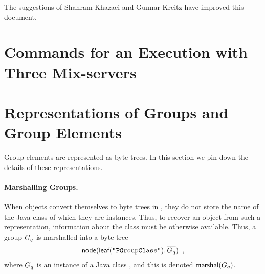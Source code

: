 \documentclass[11pt]{article}
\begin{document}
The suggestions of Shahram Khazaei and Gunnar Kreitz have improved
this document.





\appendix

\section{Commands for an Execution with Three Mix-servers}\label{sect:umexample}

\lstset{
keywordstyle=\it\ttfamily,
showstringspaces=false,
language=xml,
float,
basicstyle=\tt\xmlfontsize,
}







\section{Representations of Groups and Group
  Elements}\label{sect:groupelems}

Group elements are represented as byte trees. In this section we pin
down the details of these representations.

\begin{itemize}



\end{itemize}

\paragraph{Marshalling Groups.}

When objects convert themselves to byte trees in \veri, they do not
store the name of the Java class of which they are instances. Thus, to
recover an object from such a representation, information about the
class must be otherwise available. Thus, a group $G_{q}$ is marshalled
into a byte tree 
\begin{align*}
  \textsf{node}(\textsf{leaf}(\texttt{"PGroupClass"}),\overline{G_{q}})\enspace,
\end{align*}
where $G_{q}$ is an instance of a Java class , and
this is denoted $\textsf{marshal}(G_{q})$.
\end{document}
